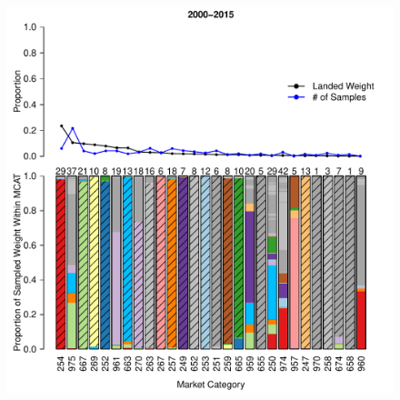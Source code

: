 \documentclass[12pt]{article}
\begin{document}
%
\clearpage
%

\begin{landscape}
\begin{figure}[h!]
\centering
\vspace{-1.2cm}
\includegraphics[height=\textheight]{./pictures/2000to2015Bar3.pdf}

\end{figure}
\end{landscape}
\end{document}
